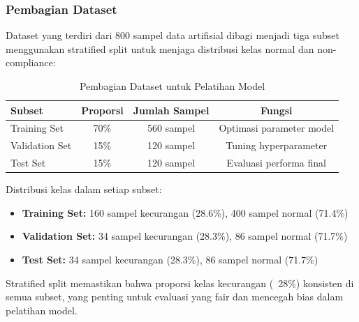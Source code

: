 \subsubsection{Pembagian Dataset}
Dataset yang terdiri dari 800 sampel data artifisial dibagi menjadi tiga subset menggunakan stratified split untuk menjaga distribusi kelas normal dan non-compliance:

\begin{table}[htbp]
\centering
\caption{Pembagian Dataset untuk Pelatihan Model}
\label{tabel:pembagianDataset}
\begin{tabular}{|l|c|c|c|}
\hline
\textbf{Subset} & \textbf{Proporsi} & \textbf{Jumlah Sampel} & \textbf{Fungsi} \\
\hline
Training Set & 70\% & 560 sampel & Optimasi parameter model \\
\hline
Validation Set & 15\% & 120 sampel & Tuning hyperparameter \\
\hline
Test Set & 15\% & 120 sampel & Evaluasi performa final \\
\hline
\end{tabular}
\end{table}

Distribusi kelas dalam setiap subset:
\begin{itemize}
    \item \textbf{Training Set:} 160 sampel kecurangan (28.6\%), 400 sampel normal (71.4\%)
    \item \textbf{Validation Set:} 34 sampel kecurangan (28.3\%), 86 sampel normal (71.7\%)
    \item \textbf{Test Set:} 34 sampel kecurangan (28.3\%), 86 sampel normal (71.7\%)
\end{itemize}

Stratified split memastikan bahwa proporsi kelas kecurangan (~28\%) konsisten di semua subset, yang penting untuk evaluasi yang fair dan mencegah bias dalam pelatihan model.

